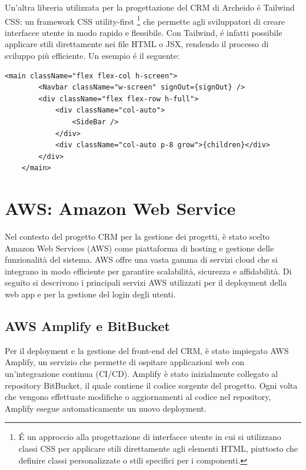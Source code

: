\documentclass[target=bach,aauheader=,style=]{thud}
\begin{document}
Un'altra libreria utilizzata per la progettazione del CRM di Archeido é Tailwind CSS: un framework CSS utility-first \footnote{É un approccio alla progettazione di interfacce utente in cui si utilizzano classi CSS per applicare stili direttamente agli elementi HTML, piuttosto che definire classi personalizzate o stili specifici per i componenti.} che permette agli sviluppatori di creare interfacce utente in modo rapido e flessibile. Con Tailwind, é infatti possibile applicare stili direttamente nei file HTML o JSX, rendendo il processo di sviluppo più efficiente. Un esempio é il seguente:
\vspace{0.8cm} 
\begin{lstlisting}[caption=Parte del file \texttt{app.tsx} del CRM]
    <main className="flex flex-col h-screen">
        <Navbar className="w-screen" signOut={signOut} />
        <div className="flex flex-row h-full">
            <div className="col-auto">
                <SideBar />
            </div>
            <div className="col-auto p-8 grow">{children}</div>
        </div>
    </main> 
\end{lstlisting}

\section{AWS: Amazon Web Service}
Nel contesto del progetto CRM per la gestione dei progetti, è stato scelto Amazon Web Services (AWS) come piattaforma di hosting e gestione delle funzionalità del sistema. AWS offre una vasta gamma di servizi cloud che si integrano in modo efficiente per garantire scalabilità, sicurezza e affidabilità. Di seguito si descrivono i principali servizi AWS utilizzati per il deployment della web app e per la gestione del login degli utenti.

\subsection{AWS Amplify e BitBucket}
Per il deployment e la gestione del front-end del CRM, è stato impiegato AWS Amplify, un servizio che permette di ospitare applicazioni web con un'integrazione continua (CI/CD). Amplify è stato inizialmente collegato al repository BitBucket, il quale contiene il codice sorgente del progetto. Ogni volta che vengono effettuate modifiche o aggiornamenti al codice nel repository, Amplify esegue automaticamente un nuovo deployment.
\end{document}
